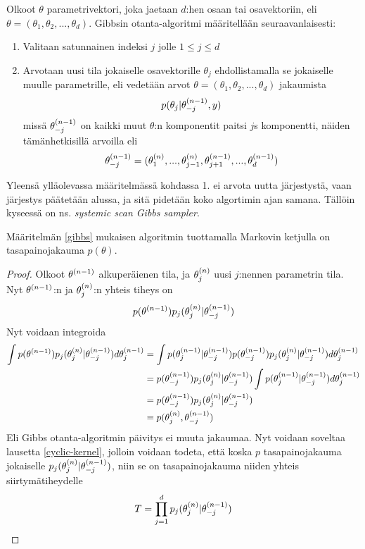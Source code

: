\begin{maar}\label{gibbs}
	Olkoot $\theta$ parametrivektori, joka jaetaan $d$:hen osaan tai osavektoriin, eli $\theta = (\theta_1, \theta_2,...,\theta_d)$. Gibbsin otanta-algoritmi määritellään seuraavanlaisesti:
	\begin{enumerate}
		\item Valitaan satunnainen indeksi $j$ jolle $1 \leq j \leq d$
		\item Arvotaan uusi tila jokaiselle osavektorille $\theta_j$ ehdollistamalla se jokaiselle muulle parametrille, eli vedetään arvot $\theta = (\theta_1, \theta_2,...,\theta_d)$ jakaumista
		\begin{equation}
			p(\theta_j|\theta^{(n-1)}_{-j},y)
		\end{equation}
		missä $\theta^{(n-1)}_{-j}$ on kaikki muut $\theta$:n komponentit paitsi $j$s komponentti, näiden tämänhetkisillä arvoilla eli 
		\begin{equation*}
			\theta^{(n-1)}_{-j} = (\theta^{(n)}_{1},...,\theta^{(n)}_{j-1},\theta^{(n-1)}_{j+1},...,\theta^{(n-1)}_{d})
		\end{equation*}
	\end{enumerate}
\end{maar}

Yleensä ylläolevassa määritelmässä kohdassa 1. ei arvota uutta järjestystä, vaan järjestys päätetään alussa, ja sitä pidetään koko algortimin ajan samana. Tällöin kyseessä on ns. \textit{systemic scan Gibbs sampler}.

\begin{lause}
	Määritelmän \ref{gibbs} mukaisen algoritmin tuottamalla Markovin ketjulla on tasapainojakauma $p(\theta)$. \cite{koistinen_computational_2009}
\end{lause}

\begin{proof}
	Olkoot $\theta^{(n-1)}$ alkuperäienen tila, ja $\theta^{(n)}_j$ uusi $j$:nennen parametrin tila. Nyt $\theta^{(n-1)}$:n ja $\theta^{(n)}_j$:n yhteis tiheys on 
	\begin{equation}
		p(\theta^{(n-1)})p_j(\theta^{(n)}_j|\theta^{(n-1)}_{-j})
	\end{equation}
	Nyt voidaan integroida
	\begin{equation}
		\begin{split}
			\int p(\theta^{(n-1)})p_j(\theta^{(n)}_j|\theta^{(n-1)}_{-j}) d\theta^{(n-1)}_j &= \int p(\theta^{(n-1)}_j|\theta^{(n-1)}_{-j})p(\theta^{(n-1)}_{-j})p_j(\theta^{(n)}_j|\theta^{(n-1)}_{-j}) d\theta^{(n-1)}_j \\
			&= p(\theta^{(n-1)}_{-j})p_j(\theta^{(n)}_j|\theta^{(n-1)}_{-j}) \int p(\theta^{(n-1)}_j|\theta^{(n-1)}_{-j}) d\theta^{(n-1)}_j \\
			&= p(\theta^{(n-1)}_{-j})p_j(\theta^{(n)}_j|\theta^{(n-1)}_{-j}) \\
			&= p(\theta^{(n)}_j,\theta^{(n-1)}_{-j})
		\end{split}
	\end{equation}
	Eli Gibbs otanta-algoritmin päivitys ei muuta jakaumaa. Nyt voidaan soveltaa lausetta \ref{cyclic-kernel}, jolloin voidaan todeta, että koska $p$ tasapainojakauma jokaiselle $p_j(\theta^{(n)}_j|\theta^{(n-1)}_{-j})$, niin se on tasapainojakauma niiden yhteis siirtymätiheydelle
	\begin{equation}
		T = \prod_{j=1}^{d} p_j(\theta^{(n)}_j|\theta^{(n-1)}_{-j})
	\end{equation}

\end{proof}

